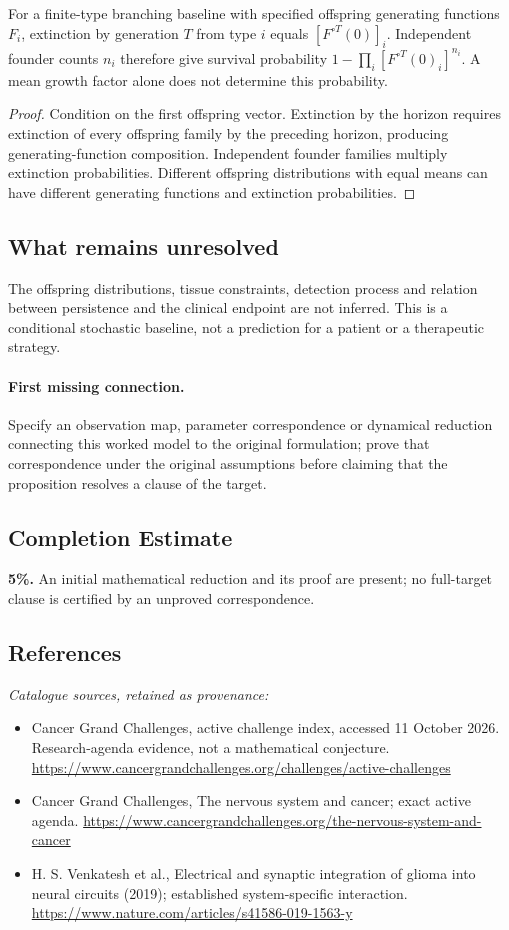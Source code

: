 \documentclass[11pt]{article}
\begin{document}
\begin{proposition}
For a finite-type branching baseline with specified offspring generating functions $F_i$, extinction by generation $T$ from type $i$ equals $[F^{\circ T}(0)]_i$. Independent founder counts $n_i$ therefore give survival probability $1-\prod_i[F^{\circ T}(0)_i]^{n_i}$. A mean growth factor alone does not determine this probability.
\end{proposition}
\begin{proof}
Condition on the first offspring vector. Extinction by the horizon requires extinction of every offspring family by the preceding horizon, producing generating-function composition. Independent founder families multiply extinction probabilities. Different offspring distributions with equal means can have different generating functions and extinction probabilities.
\end{proof}
\subsection{What remains unresolved}
The offspring distributions, tissue constraints, detection process and relation between persistence and the clinical endpoint are not inferred. This is a conditional stochastic baseline, not a prediction for a patient or a therapeutic strategy.
\paragraph{First missing connection.} Specify an observation map, parameter correspondence or dynamical reduction connecting this worked model to the original formulation; prove that correspondence under the original assumptions before claiming that the proposition resolves a clause of the target.
\subsection{Completion Estimate}
\textbf{5\%.} An initial mathematical reduction and its proof are present; no full-target clause is certified by an unproved correspondence.
\subsection{References}
\noindent\emph{Catalogue sources, retained as provenance:}
\begin{itemize}
\item Cancer Grand Challenges, active challenge index, accessed 11 October 2026. Research-agenda evidence, not a mathematical conjecture. \url{https://www.cancergrandchallenges.org/challenges/active-challenges}
\item Cancer Grand Challenges, The nervous system and cancer; exact active agenda. \url{https://www.cancergrandchallenges.org/the-nervous-system-and-cancer}
\item H. S. Venkatesh et al., Electrical and synaptic integration of glioma into neural circuits (2019); established system-specific interaction. \url{https://www.nature.com/articles/s41586-019-1563-y}
\end{itemize}
\end{document}
